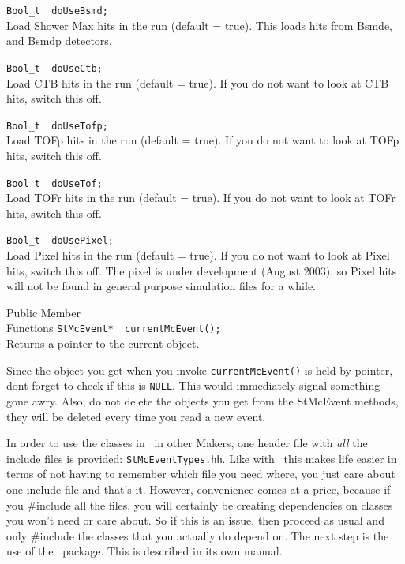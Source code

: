 \begin{Entry}
    \verb+Bool_t  doUseBsmd;+\\
	Load Shower Max hits in the run (default = true).  This loads hits from
	Bsmde, and Bsmdp detectors.

    \verb+Bool_t  doUseCtb;+\\
	Load CTB hits in the run (default = true).  If you do not want to
	look at CTB hits, switch this off.

    \verb+Bool_t  doUseTofp;+\\
	Load TOFp hits in the run (default = true).  If you do not want to
	look at TOFp hits, switch this off.

    \verb+Bool_t  doUseTof;+\\
	Load TOFr hits in the run (default = true).  If you do not want to
	look at TOFr hits, switch this off.

    \verb+Bool_t  doUsePixel;+\\
	Load Pixel hits in the run (default = true).  If you do not want to
	look at Pixel hits, switch this off.  The pixel is under development
        (August 2003), so Pixel hits will not be found in general purpose
        simulation files for a while.

\item[Public Member\\ Functions]
    \verb+StMcEvent*  currentMcEvent();+\\
    Returns a pointer to the current  object.
\end{Entry}

Since the  object you get when you invoke
{\tt currentMcEvent()} is held by pointer, dont forget to
check if this is {\tt NULL}. This would immediately signal
something gone awry.  Also, do not delete the objects
you get from the StMcEvent methods, they will be deleted
every time you read a new event.

In order to use the classes in
\StMcEvent\ in other Makers, one header file with {\it all} the include files
is provided: {\tt StMcEventTypes.hh}. 
Like with \StEvent\ this makes
life easier in terms of not having to remember which file you need where,
you just care about one include file and that's it.  However, convenience
comes at a price, because if you \#include all the files, you will certainly
be creating dependencies on classes you won't need or care about.  So if this
is an issue, then proceed as usual and only \#include the classes that you actually
do depend on.
The next step is the use of the \StAssociationMaker\ package.  This is described
in its own manual.

